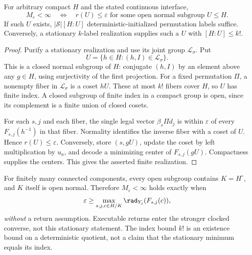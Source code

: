 \begin{theorem}\label{thm:finitequotient55}
For arbitrary compact $H$ and the stated continuous interface,
\[
 M_\varepsilon<\infty
 \quad\Longleftrightarrow\quad
 r(U)\le\varepsilon\text{ for some open normal subgroup }U\le H.
\]
If such $U$ exists, $|\mathcal S|[H:U]$ deterministic-initialized permutation labels suffice. Conversely, a stationary $k$-label realization supplies such a $U$ with $[H:U]\le k!$.
\end{theorem}
\begin{proof}
Purify a stationary realization and use its joint group $\mathcal L_\sigma$. Put
\[
                  U=\{h\in H:(h,I)\in\mathcal L_\sigma\}.
\]
This is a closed normal subgroup of $H$: conjugate $(h,I)$ by an element above any $g\in H$, using surjectivity of the first projection. For a fixed permutation $\Pi$, a nonempty fiber in $\mathcal L_\sigma$ is a coset $hU$. These at most $k!$ fibers cover $H$, so $U$ has finite index. A closed subgroup of finite index in a compact group is open, since its complement is a finite union of closed cosets.

For each $s,j$ and each fiber, the single legal vector $\beta_s\Pi d_j$ is within $\varepsilon$ of every $F_{s,j}(h^{-1})$ in that fiber. Normality identifies the inverse fiber with a coset of $U$. Hence $r(U)\le\varepsilon$. Conversely, store $(s,gU)$, update the coset by left multiplication by $u_a$, and decode a minimizing center of $F_{s,j}(gU)$. Compactness supplies the centers. This gives the asserted finite realization.
\end{proof}
For finitely many connected components, every open subgroup contains $K=H^\circ$, and $K$ itself is open normal. Therefore $M_\varepsilon<\infty$ holds exactly when
\[
 \varepsilon\ge\max_{s,j,c\in H/K}\rad_{Y_j}(F_{s,j}(c)),
\]
\emph{without} a return assumption. Executable returns enter the stronger clocked converse, not this stationary statement. The index bound $k!$ is an existence bound on a deterministic quotient, not a claim that the stationary minimum equals its index.

